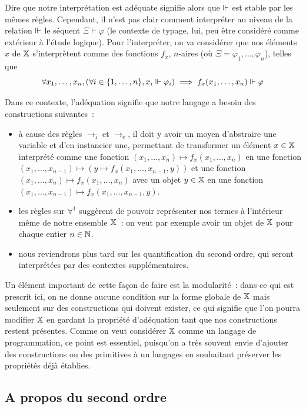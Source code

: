 \documentclass{article}
\begin{document}
Dire que notre interprétation est adéquate signifie alors que $\Vdash$ est stable par les mêmes règles. Cependant, il n'est pas clair comment interpréter au niveau de la relation $\Vdash$ le séquent $\Xi\vdash \varphi$ (le contexte de typage, lui, peu être considéré comme extérieur à l'étude logique). Pour l'interpréter, on va considérer que nos éléments $x$ de $\mathbb X$ s'interprètent comme des fonctions $f_x$, $n$-aires (où $\Xi = \varphi_1,\ldots,\varphi_n$), telles que
\[\forall x_1,\ldots,x_n, (\forall i \in \{1,\ldots,n\}, x_i \Vdash \varphi_i)\implies f_x(x_1,\ldots,x_n)\Vdash\varphi\]

Dans ce contexte, l'adéquation signifie que notre langage a besoin des constructions suivantes~:
\begin{itemize}
    \item à cause des règles $\to_\mathrm i$ et $\to_\mathrm e$, il doit y avoir un moyen d'abstraire une variable et d'en instancier une, permettant de transformer un élément $x\in\mathbb X$ interprété comme une fonction $(x_1,\ldots,x_n) \mapsto f_x(x_1,\ldots,x_n)$ en une fonction $(x_1,\ldots,x_{n-1})\mapsto (y\mapsto f_x(x_1,\ldots,x_{n-1},y))$ et une fonction $(x_1,\ldots,x_n)\mapsto f_x(x_1,\ldots,x_n)$ avec un objet $y\in\mathbb X$ en une fonction $(x_1,\ldots,x_{n-1})\mapsto f_x(x_1,\ldots,x_{n-1},y)$.
    \item les règles sur $\forall^1$ suggèrent de pouvoir représenter nos termes à l'intérieur même de notre ensemble $\mathbb X$~: on veut par exemple avoir un objet de $\mathbb X$ pour chaque entier $n\in\mathbb{N}$.
    \item nous reviendrons plus tard sur les quantification du second ordre, qui seront interprétées par des contextes supplémentaires.
\end{itemize}

Un élément important de cette façon de faire est la modularité~: dans ce qui est prescrit ici, on ne donne aucune condition sur la forme globale de $\mathbb X$ mais seulement sur des constructions qui doivent exister, ce qui signifie que l'on pourra modifier $\mathbb X$ en gardant la propriété d'adéquation tant que nos constructions restent présentes. Comme on veut considérer $\mathbb X$ comme un langage de programmation, ce point est essentiel, puisqu'on a très souvent envie d'ajouter des constructions ou des primitives à un langages en souhaitant préserver les propriétés déjà établies.

\subsection{A propos du second ordre}
\end{document}
